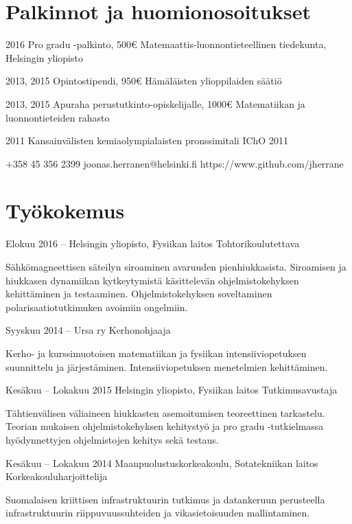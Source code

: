 \documentclass{tccv}
\begin{document}
\section{Palkinnot ja huomionosoitukset}
\begin{yearlist}
	\item{2016}
	{Pro gradu -palkinto, 500€}
	{Matemaattis-luonnontieteellinen tiedekunta, Helsingin yliopisto}
	\item{2013, 2015}
	{Opintostipendi, 950€}
	{Hämäläisten ylioppilaiden säätiö}	
	\item{2013, 2015}
	{Apuraha perustutkinto-opiskelijalle, 1000€}
	{Matematiikan ja luonnontieteiden rahasto}	
	\item{2011}
	{Kansainvälisten kemiaolympialaisten pronssimitali}
	{IChO 2011}	
\end{yearlist}

{+358 45 356 2399}
{joonas.herranen@helsinki.fi}
{https://www.github.com/jherrane}

\section{Työkokemus}
\begin{eventlist}	
	\item{Elokuu 2016 -- }
	{Helsingin yliopisto, Fysiikan laitos}
	{Tohtorikoulutettava}
	
	Sähkömagneettisen säteilyn siroaminen avaruuden pienhiukkasista. Siroamisen ja hiukkasen dynamiikan kytkeytymistä käsittelevän ohjelmistokehyksen kehittäminen ja testaaminen. Ohjelmistokehyksen soveltaminen polarisaatiotutkimuken avoimiin ongelmiin.
	
	\item{Syyskuu 2014 --}
	{Ursa ry}
	{Kerhonohjaaja}
	
	Kerho- ja kurssimuotoisen matematiikan ja fysiikan intensiiviopetuksen suunnittelu ja järjestäminen. Intensiiviopetuksen menetelmien kehittäminen. 
	
	\item{Kesäkuu -- Lokakuu 2015}
	{Helsingin yliopisto, Fysiikan laitos}
	{Tutkimusavustaja}
	
	Tähtienvälisen väliaineen hiukkasten asemoitumisen teoreettinen tarkastelu. Teorian mukaisen ohjelmistokehyksen kehitystyö ja pro gradu -tutkielmassa hyödynnettyjen ohjelmistojen kehitys sekä testaus.
	
	\item{Kesäkuu -- Lokakuu 2014}
	{Maanpuolustuskorkeakoulu, Sotatekniikan laitos}
	{Korkeakouluharjoittelija}
	
	Suomalaisen kriittisen infrastruktuurin tutkimus ja da\-tan\-ke\-ruun perusteella infrastruktuurin riippuvuussuhteiden ja vikasietoisuuden mallintaminen.
	
\end{eventlist}
\pagebreak
\end{document}
